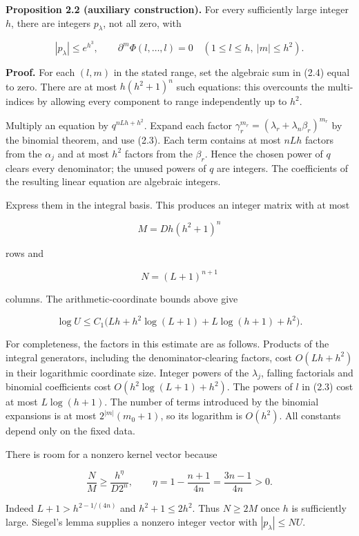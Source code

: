 \documentclass[
  11pt,
  a4paper,
]{article}
\begin{document}
\textbf{Proposition 2.2 (auxiliary construction).} For every
sufficiently large integer \(h\), there are integers \(p_\lambda\), not
all zero, with

\[
|p_\lambda|\le e^{h^3},
\qquad
\partial^m\Phi(l,\ldots,l)=0
\quad(1\le l\le h,\ |m|\le h^2). \tag{2.5}
\]

\textbf{Proof.} For each \((l,m)\) in the stated range, set the
algebraic sum in (2.4) equal to zero. There are at most \(h(h^2+1)^n\)
such equations: this overcounts the multi-indices by allowing every
component to range independently up to \(h^2\).

Multiply an equation by \(q^{nLh+h^2}\). Expand each factor
\(\gamma_r^{m_r}=(\lambda_r+\lambda_n\beta_r)^{m_r}\) by the binomial
theorem, and use (2.3). Each term contains at most \(nLh\) factors from
the \(\alpha_j\) and at most \(h^2\) factors from the \(\beta_r\). Hence
the chosen power of \(q\) clears every denominator; the unused powers of
\(q\) are integers. The coefficients of the resulting linear equation
are algebraic integers.

Express them in the integral basis. This produces an integer matrix with
at most

\[
M=D h(h^2+1)^n
\]

rows and

\[
N=(L+1)^{n+1}
\]

columns. The arithmetic-coordinate bounds above give

\[
\log U\le C_1\bigl(Lh+h^2\log(L+1)+L\log(h+1)+h^2\bigr). \tag{2.6}
\]

For completeness, the factors in this estimate are as follows. Products
of the integral generators, including the denominator-clearing factors,
cost \(O(Lh+h^2)\) in their logarithmic coordinate size. Integer powers
of the \(\lambda_j\), falling factorials and binomial coefficients cost
\(O(h^2\log(L+1)+h^2)\). The powers of \(l\) in (2.3) cost at most
\(L\log(h+1)\). The number of terms introduced by the binomial
expansions is at most \(2^{|m|}(m_0+1)\), so its logarithm is
\(O(h^2)\). All constants depend only on the fixed data.

There is room for a nonzero kernel vector because

\[
\frac NM\ge\frac{h^{\eta}}{D2^n},
\qquad \eta=1-\frac{n+1}{4n}=\frac{3n-1}{4n}>0.
\]

Indeed \(L+1>h^{2-1/(4n)}\) and \(h^2+1\le2h^2\). Thus \(N\ge2M\) once
\(h\) is sufficiently large. Siegel's lemma supplies a nonzero integer
vector with \(|p_\lambda|\le NU\).
\end{document}

